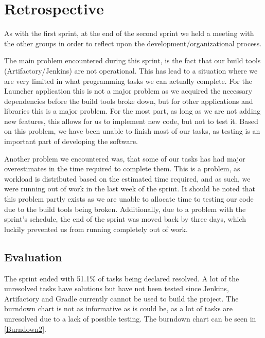 \section{Retrospective}\label{S2Retro}
As with the first sprint, at the end of the second sprint we held a meeting with
the other groups in order to reflect upon the development/organizational
process.\nl

The main problem encountered during this sprint, is the fact that our build
tools (Artifactory/Jenkins) are not operational. This has lead to a
situation where we are very limited in what programming tasks we can actually
complete. For the Launcher application this is not a major problem as we
acquired the necessary dependencies before the build tools broke down, but for
other applications and libraries this is a major problem. For the most part, as
long as we are not adding new features, this allows for us to implement new
code, but not to test it. Based on this problem, we have been unable to finish
most of our tasks, as testing is an important part of developing the
software.\nl

Another problem we encountered was, that some of our tasks has had major
overestimates in the time required to complete them. This is a problem, as
workload is distributed based on the estimated time required, and as such, we
were running out of work in the last week of the sprint. It should be noted that
this problem partly exists as we are unable to allocate time to testing our code
due to the build tools being broken. Additionally, due to a problem with the
sprint's schedule, the end of the sprint was moved back by three days, which
luckily prevented us from running completely out of work.

\subsection{Evaluation}
The sprint ended with 51.1\% of tasks being declared resolved. A lot of the
unresolved tasks have solutions but have not been tested since Jenkins,
Artifactory and Gradle currently cannot be used to build the project.
The burndown chart is not as informative as is could
be, as a lot of tasks are unresolved due to a lack of
possible testing. The burndown chart can be seen in \autoref{Burndown2}.






